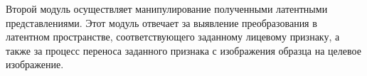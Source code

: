 Второй модуль осуществляет манипулирование полученными латентными представлениями. Этот модуль отвечает за выявление преобразования в латентном пространстве, соответствующего заданному лицевому признаку, а также за процесс переноса заданного признака с изображения образца на целевое изображение.

